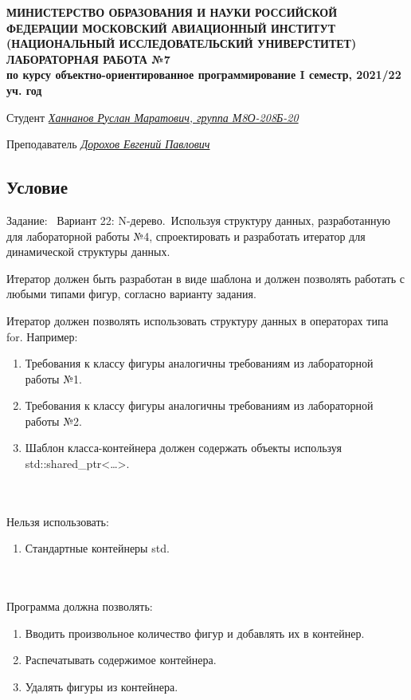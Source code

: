 \documentclass[12pt]{article}
\begin{document}
\begin{titlepage}
\begin{center}
\textbf{МИНИСТЕРСТВО ОБРАЗОВАНИЯ И НАУКИ РОССИЙСКОЙ ФЕДЕРАЦИИ
\medskip
МОСКОВСКИЙ АВИАЦИОННЫЙ ИНСТИТУТ
(НАЦИОНАЛЬНЫЙ ИССЛЕДОВАТЕЛЬСКИЙ УНИВЕРСТИТЕТ)
\vfill\vfill
{\Huge ЛАБОРАТОРНАЯ РАБОТА №7} \\
по курсу объектно-ориентированное программирование
I семестр, 2021/22 уч. год}
\end{center}
\vfill

Студент \uline{\it {Ханнанов Руслан Маратович, группа М8О-208Б-20}\hfill}

Преподаватель \uline{\it {Дорохов Евгений Павлович}\hfill}

\vfill
\end{titlepage}

\subsection*{Условие}

Задание: \
Вариант 22: N-дерево.\
Используя структуру данных, разработанную для лабораторной работы №4, спроектировать и разработать итератор для динамической структуры данных.

Итератор должен быть разработан в виде шаблона и должен позволять работать с любыми типами фигур, согласно варианту задания.
 
Итератор должен позволять использовать структуру данных в операторах типа for. Например:

\begin{enumerate}
\item Требования к классу фигуры аналогичны требованиям из лабораторной работы №1.
\item Требования к классу фигуры аналогичны требованиям из лабораторной работы №2.
\item Шаблон класса-контейнера должен содержать объекты используя std::shared\_ptr<…>.
\end{enumerate}
\\ \\
Нельзя использовать:
\begin{enumerate}
\item Стандартные контейнеры std.
\end{enumerate}
\\ \\
Программа должна позволять:
\begin{enumerate}
\item Вводить произвольное количество фигур и добавлять их в контейнер.
\item Распечатывать содержимое контейнера.
\item Удалять фигуры из контейнера.
\end{enumerate}
\end{document}
